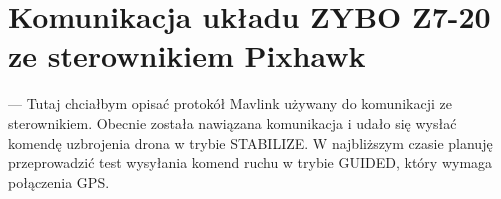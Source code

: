 
\section{Komunikacja układu ZYBO Z7-20 ze sterownikiem Pixhawk}
\label{sec:komunikacja_ukladu_ZYBO_ze_sterownikiem_ Pixhawk} 
--- Tutaj chciałbym opisać protokół Mavlink używany do komunikacji ze sterownikiem. Obecnie została nawiązana komunikacja i udało się wysłać komendę uzbrojenia drona w trybie STABILIZE. W najbliższym czasie planuję przeprowadzić test wysyłania komend ruchu w trybie GUIDED, który wymaga połączenia GPS.
